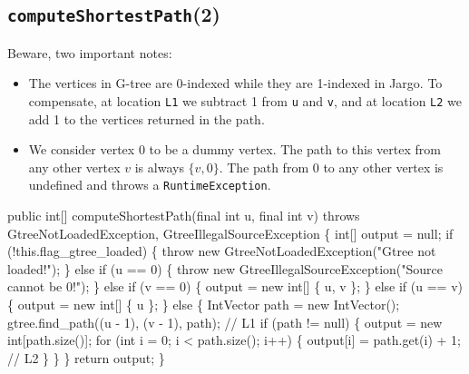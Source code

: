 \subsection{{\tt{}\protect{}computeShortestPath}(2)}
Beware, two important notes:
\begin{itemize}
\item The vertices in G-tree are 0-indexed while they are 1-indexed in Jargo.  To
compensate, at location {\tt{}L1} we subtract 1 from {\tt{}u} and {\tt{}v}, and at
location {\tt{}L2} we add 1 to the vertices returned in the path.
\item We consider vertex 0 to be a dummy vertex. The path to this vertex
from any other vertex $v$ is always $\{v, 0\}$. The path from 0 to any other
vertex is undefined and throws a {\tt{}RuntimeException}.
\end{itemize}
\nwenddocs{}\endmoddef{}
public int[] computeShortestPath(final int u, final int v)
throws GtreeNotLoadedException, GtreeIllegalSourceException \{
  int[] output = null;
  if (!this.flag_gtree_loaded) \{
    throw new GtreeNotLoadedException("Gtree not loaded!");
  \} else if (u == 0) \{
    throw new GtreeIllegalSourceException("Source cannot be 0!");
  \} else if (v == 0) \{
    output = new int[] \{ u, v \};
  \} else if (u == v) \{
    output = new int[] \{ u \};
  \} else \{
    IntVector path = new IntVector();
    gtree.find_path((u - 1), (v - 1), path);        // L1
    if (path != null) \{
      output = new int[path.size()];
      for (int i = 0; i < path.size(); i++) \{
        output[i] = path.get(i) + 1;                // L2
      \}
    \}
  \}
  return output;
\}
\eatline
{}\nwendcode{}\nwdocspar
